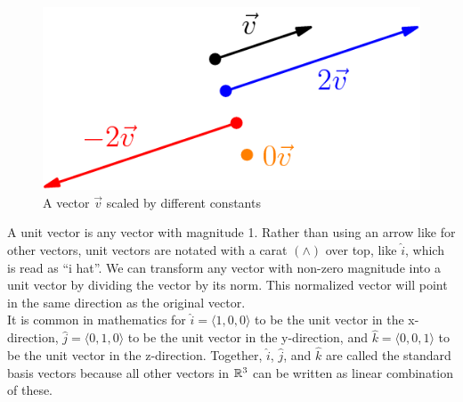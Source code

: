 \begin{figure}[H]
	\centering
	\includegraphics[scale=0.5]{../common/vectorsMatrices/ScalarMultiples.png}
	\caption{A vector $\vec{v}$ scaled by different constants}
\end{figure}

\noindent
A unit vector is any vector with magnitude 1.
Rather than using an arrow like for other vectors, unit vectors are notated with a carat $\left(\wedge \right)$ over top, like $\hat{i}$, which is read as ``i hat''.
We can transform any vector with non-zero magnitude into a unit vector by dividing the vector by its norm.
This normalized vector will point in the same direction as the original vector.\\

\noindent
It is common in mathematics for $\hat{i} = \langle 1,0,0 \rangle$ to be the unit vector in the x-direction, $\hat{j} = \langle 0,1,0 \rangle$ to be the unit vector in the y-direction, and $\hat{k} = \langle 0,0,1 \rangle$ to be the unit vector in the z-direction.
Together, $\hat{i}$, $\hat{j}$, and $\hat{k}$ are called the standard basis vectors because all other vectors in $\mathbb{R}^3$ can be written as linear combination of these.

